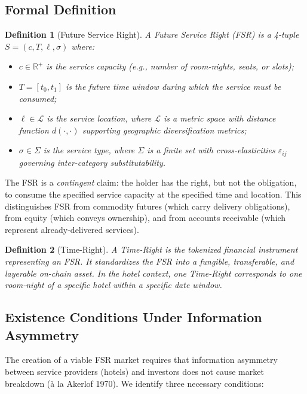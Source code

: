 \documentclass[12pt,a4paper]{article}
\newtheorem{definition}{Definition}
\begin{document}
\subsection{Formal Definition}

\begin{definition}[Future Service Right]
A Future Service Right (FSR) is a 4-tuple $S = (c, T, \ell, \sigma)$ where:
\begin{itemize}[nosep]
    \item $c \in \mathbb{R}^+$ is the service capacity (e.g., number of room-nights, seats, or slots);
    \item $T = [t_0, t_1]$ is the future time window during which the service must be consumed;
    \item $\ell \in \mathcal{L}$ is the service location, where $\mathcal{L}$ is a metric space with distance function $d(\cdot, \cdot)$ supporting geographic diversification metrics;
    \item $\sigma \in \Sigma$ is the service type, where $\Sigma$ is a finite set with cross-elasticities $\varepsilon_{ij}$ governing inter-category substitutability.
\end{itemize}
\end{definition}

The FSR is a \emph{contingent} claim: the holder has the right, but not the obligation, to consume the specified service capacity at the specified time and location.
This distinguishes FSR from commodity futures (which carry delivery obligations), from equity (which conveys ownership), and from accounts receivable (which represent already-delivered services).

\begin{definition}[Time-Right]
A Time-Right is the tokenized financial instrument representing an FSR.
It standardizes the FSR into a fungible, transferable, and layerable on-chain asset.
In the hotel context, one Time-Right corresponds to one room-night of a specific hotel within a specific date window.
\end{definition}

\subsection{Existence Conditions Under Information Asymmetry}

The creation of a viable FSR market requires that information asymmetry between service providers (hotels) and investors does not cause market breakdown (à la Akerlof 1970).
We identify three necessary conditions:
\end{document}
